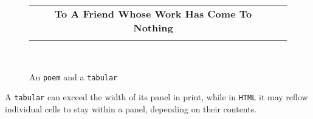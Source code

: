 \documentclass[10pt,]{article}
\theoremstyle{plain}
\theoremstyle{definition}
\theoremstyle{definition}
\theoremstyle{definition}
\theoremstyle{definition}
\theoremstyle{definition}
\theoremstyle{definition}
\numberwithin{equation}{section}
\newlength{\panelmax}
\begin{document}
\begin{figure}
{\par\medskip\noindent
\hspace*{0.05\linewidth}%
\begin{tabular}{@{}*{2}{c}@{}}
\parbox[t]{0.4\linewidth}{\centering{}\textbf{To A Friend Whose Work Has Come To Nothing}}&
\tabularnewline
\begin{minipage}[c][\panelmax][t]{0.4\linewidth}\usebox{\panelboxApoem}\end{minipage}&
\begin{minipage}[c][\panelmax][t]{0.45\linewidth}\usebox{\panelboxAtabular}\end{minipage}\end{tabular}\\
}%
\caption{An \lstinline?poem? and a \lstinline?tabular?\label{figure-117}}
\end{figure}
\hypertarget{p-746}{}%
A \lstinline?tabular? can exceed the width of its panel in print, while in \lstinline?HTML? it may reflow individual cells to stay within a panel, depending on their contents.%
\end{document}
